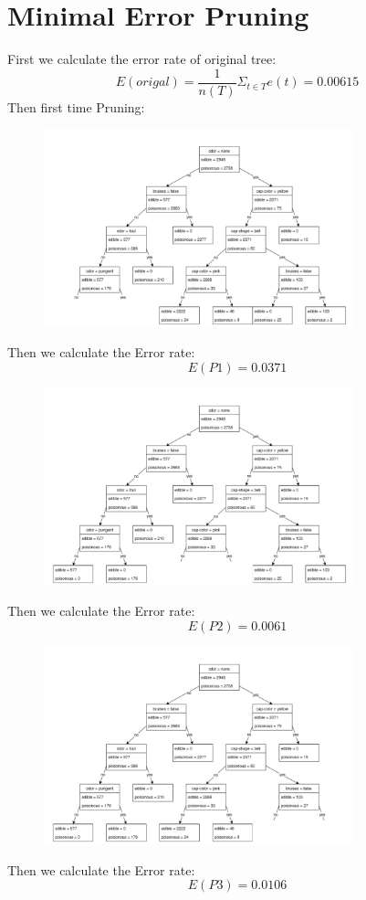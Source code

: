 \documentclass{article}
\begin{document}
\section{Minimal Error Pruning}
First we calculate the error rate of original tree:\\
\[E(origal)=\frac{1}{n(T)}\Sigma_{t\in T}e(t)=0.00615\]
Then first time Pruning:
\begin{figure}[H]
    \centering
    \includegraphics[width=0.8\textwidth]{pruningVier_1.png}
\end{figure}
Then we calculate the Error rate:\\
\[E(P1)=0.0371\]
\begin{figure}[H]
    \centering
    \includegraphics[width=0.8\textwidth]{pruningVier_2.png}
\end{figure}
Then we calculate the Error rate:\\
\[E(P2)=0.0061\]
\begin{figure}[H]
    \centering
    \includegraphics[width=0.8\textwidth]{pruningVier_3.png}
\end{figure}
Then we calculate the Error rate:\\
\[E(P3)=0.0106\]
\end{document}
